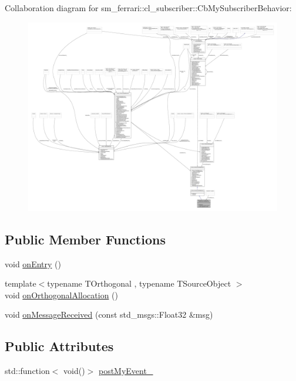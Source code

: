 Collaboration diagram for sm\+\_\+ferrari\+:\+:cl\+\_\+subscriber\+:\+:Cb\+My\+Subscriber\+Behavior\+:
\nopagebreak
\begin{figure}[H]
\begin{center}
\leavevmode
\includegraphics[width=350pt]{classsm__ferrari_1_1cl__subscriber_1_1CbMySubscriberBehavior__coll__graph}
\end{center}
\end{figure}
\subsection*{Public Member Functions}
\begin{DoxyCompactItemize}
\item 
void \hyperlink{classsm__ferrari_1_1cl__subscriber_1_1CbMySubscriberBehavior_a16c8c5e65f02bd76081c3dc13367776a}{on\+Entry} ()
\item 
{\footnotesize template$<$typename T\+Orthogonal , typename T\+Source\+Object $>$ }\\void \hyperlink{classsm__ferrari_1_1cl__subscriber_1_1CbMySubscriberBehavior_ab3b93bd780a1dea560e55e0a81f9dbe2}{on\+Orthogonal\+Allocation} ()
\item 
void \hyperlink{classsm__ferrari_1_1cl__subscriber_1_1CbMySubscriberBehavior_a9dcea2976705d72df667f747328eb7d6}{on\+Message\+Received} (const std\+\_\+msgs\+::\+Float32 \&msg)
\end{DoxyCompactItemize}
\subsection*{Public Attributes}
\begin{DoxyCompactItemize}
\item 
std\+::function$<$ void()$>$ \hyperlink{classsm__ferrari_1_1cl__subscriber_1_1CbMySubscriberBehavior_a54dd6633b3105bd2b1d9432ed1462ff0}{post\+My\+Event\+\_\+}
\end{DoxyCompactItemize}

